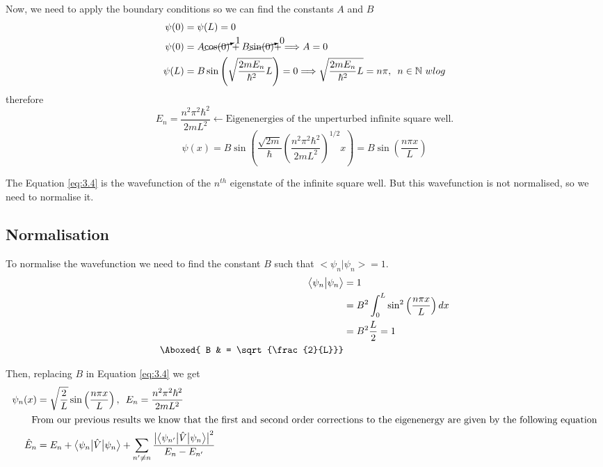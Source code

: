 \documentclass[12pt]{article}
\begin{document}
Now, we need to apply the boundary conditions so we can find the constants $A$ and $B$
\begin{align*}
	\psi (0) & = \psi (L) = 0\\
	\psi(0) & = A \cancelto{1}{\cos(0)} + B \cancelto{0}{\sin(0)} + \Longrightarrow A = 0\\
	\psi(L) & = B \sin\left(\sqrt{\frac{2mE_n}{\hbar^2}L}\right) = 0 \Longrightarrow 
	\sqrt{\frac{2mE_n}{\hbar^2}L} = n\pi,\,\,\, n \in \mathbb{N}\,\,wlog
\end{align*}
therefore
\begin{equation*}
	E_n = \frac{n^2 \pi^2 \hbar^2}{2mL^2} \longleftarrow \text{Eigenenergies
		of the unperturbed infinite square well.}
\end{equation*}
\begin{equation}
  \label{eq:3.4}
	\psi(x) = B \sin \left(\frac{\sqrt{2m}}{\hbar}\left(\frac{n^2 \pi^2 \hbar^2}{2mL^2} \right)^{1/2}
	x\right) = B \sin \left(\frac{n\pi x}{L} \right)
\end{equation}

The Equation \ref{eq:3.4} is the wavefunction of the $n^{th}$ eigenstate of the infinite square well. But this wavefunction is not normalised, so we need to normalise it. 
\subsection{Normalisation}

To normalise the wavefunction we need to find the constant $B$ such that $\big<\psi_n\big|\psi_n\big> = 1$.
\begin{align}
	\big<\psi_n\big|\psi_n \big> & = 1 \nonumber\\
	& = B^2 \int_{0}^{L}\sin^2 \left(\frac{n\pi x}{L}\right)dx \nonumber \\
	& = B^2 \frac{L}{2} = 1 \nonumber\\
	\Aboxed{ B & = \sqrt{\frac{2}{L}}}
\end{align}

Then, replacing $B$ in Equation \ref{eq:3.4} we get
\begin{align}
  \label{eq:3.6}
	\psi_n (x) & = \sqrt{\frac{2}{L}} \sin \left(\frac{n\pi x}{L} \right),\,\,\,E_n = \frac{n^2 \pi^2
	\hbar^2}{2mL^2}\nonumber\\
  \intertext{\qquad From our previous results we know that the first and second order corrections to the eigenenergy are given by the following equation}
		\hat{E}_n & = E_n + \big<\psi_n\big|\hat{V}\big|\psi_n\big> + \sum_{n'\neq n} 
		\frac{\big|\big<\psi_{n'}\big|\hat{V}\big|\psi_n\big>\big|^2}{E_n - E_{n'}}
\end{align}
\end{document}

